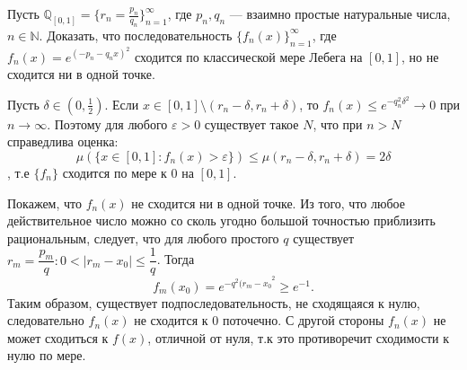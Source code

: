 \begin{task}{5}
Пусть  $\mathbb{Q}_[0, 1] = \{r_n = \frac{p_n}{q_n}\}_{n=1}^{\infty}$, где $p_n, q_n$ --- взаимно простые натуральные числа, $n \in \mathbb{N}$. Доказать, что последовательность $\{f_n(x)\}_{n=1}^{\infty}$, где $f_n(x) = e^{(-p_n - q_nx)^2}$ сходится по классической мере Лебега на $[0, 1]$, но не сходится ни в одной точке.
\end{task}

\begin{solution}
Пусть $\delta \in (0, \frac{1}{2})$. Если $x \in [0, 1] \setminus (r_n - \delta, r_n + \delta)$, то $f_n(x) \leqslant e^{-q_n^2\delta^2} \to 0$ при $n \to \infty$. Поэтому для любого $\varepsilon > 0$ существует такое $N$, что при $n > N$ справедлива оценка:
$$\mu(\{x \in [0, 1]: f_n(x) > \varepsilon\}) \leqslant \mu(r_n - \delta, r_n + \delta) = 2\delta $$, т.е $\{f_n\}$ сходится по мере к $0$ на $[0, 1]$.

Покажем, что $f_n(x)$ не сходится ни в одной точке. Из того, что любое действительное число можно со сколь угодно большой точностью приблизить рациональным, следует, что  для любого простого $q$ существует $r_m = \dfrac{p_m}{q}: 0 < |r_m - x_0| \leqslant \dfrac{1}{q}$. Тогда
$$ f_m(x_0) = e^{-q^2(r_m - x_0}^2 \geqslant e^{-1}.$$
Таким образом, существует подпоследовательность, не сходящаяся к нулю, следовательно $f_n(x)$ не сходится к $0$ поточечно. С другой стороны $f_n(x)$ не может сходиться к $f(x)$, отличной от нуля, т.к это противоречит сходимости к нулю по мере. 
\end{solution}